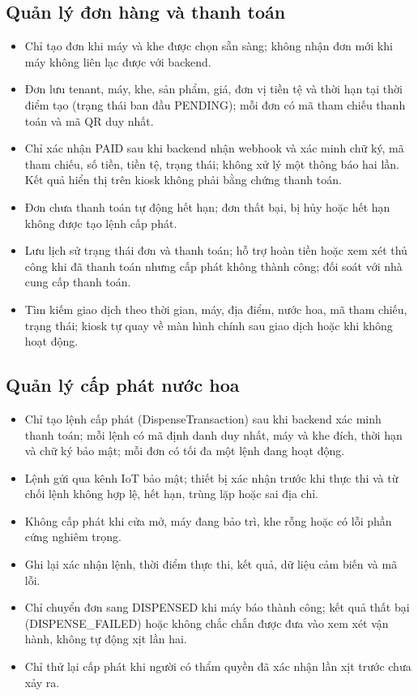 \subsection{Quản lý đơn hàng và thanh toán}
\begin{itemize}
  \item Chỉ tạo đơn khi máy và khe được chọn sẵn sàng; không nhận đơn mới khi máy không liên lạc được với backend.
  \item Đơn lưu tenant, máy, khe, sản phẩm, giá, đơn vị tiền tệ và thời hạn tại thời điểm tạo (trạng thái ban đầu PENDING); mỗi đơn có mã tham chiếu thanh toán và mã QR duy nhất.
  \item Chỉ xác nhận PAID sau khi backend nhận webhook và xác minh chữ ký, mã tham chiếu, số tiền, tiền tệ, trạng thái; không xử lý một thông báo hai lần. Kết quả hiển thị trên kiosk không phải bằng chứng thanh toán.
  \item Đơn chưa thanh toán tự động hết hạn; đơn thất bại, bị hủy hoặc hết hạn không được tạo lệnh cấp phát.
  \item Lưu lịch sử trạng thái đơn và thanh toán; hỗ trợ hoàn tiền hoặc xem xét thủ công khi đã thanh toán nhưng cấp phát không thành công; đối soát với nhà cung cấp thanh toán.
  \item Tìm kiếm giao dịch theo thời gian, máy, địa điểm, nước hoa, mã tham chiếu, trạng thái; kiosk tự quay về màn hình chính sau giao dịch hoặc khi không hoạt động.
\end{itemize}
\subsection{Quản lý cấp phát nước hoa}
\begin{itemize}
  \item Chỉ tạo lệnh cấp phát (DispenseTransaction) sau khi backend xác minh thanh toán; mỗi lệnh có mã định danh duy nhất, máy và khe đích, thời hạn và chữ ký bảo mật; mỗi đơn có tối đa một lệnh đang hoạt động.
  \item Lệnh gửi qua kênh IoT bảo mật; thiết bị xác nhận trước khi thực thi và từ chối lệnh không hợp lệ, hết hạn, trùng lặp hoặc sai địa chỉ.
  \item Không cấp phát khi cửa mở, máy đang bảo trì, khe rỗng hoặc có lỗi phần cứng nghiêm trọng.
  \item Ghi lại xác nhận lệnh, thời điểm thực thi, kết quả, dữ liệu cảm biến và mã lỗi.
  \item Chỉ chuyển đơn sang DISPENSED khi máy báo thành công; kết quả thất bại (DISPENSE\_FAILED) hoặc không chắc chắn được đưa vào xem xét vận hành, không tự động xịt lần hai.
  \item Chỉ thử lại cấp phát khi người có thẩm quyền đã xác nhận lần xịt trước chưa xảy ra.
\end{itemize}
